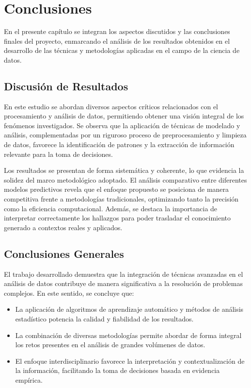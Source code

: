 \chapter{Conclusiones}

En el presente capítulo se integran los aspectos discutidos y las conclusiones finales del proyecto, enmarcando el análisis de los resultados obtenidos en el desarrollo de las técnicas y metodologías aplicadas en el campo de la ciencia de datos.

\section{Discusión de Resultados}

En este estudio se abordan diversos aspectos críticos relacionados con el procesamiento y análisis de datos, permitiendo obtener una visión integral de los fenómenos investigados. Se observa que la aplicación de técnicas de modelado y análisis, complementadas por un riguroso proceso de preprocesamiento y limpieza de datos, favorece la identificación de patrones y la extracción de información relevante para la toma de decisiones.

Los resultados se presentan de forma sistemática y coherente, lo que evidencia la solidez del marco metodológico adoptado. El análisis comparativo entre diferentes modelos predictivos revela que el enfoque propuesto se posiciona de manera competitiva frente a metodologías tradicionales, optimizando tanto la precisión como la eficiencia computacional. Además, se destaca la importancia de interpretar correctamente los hallazgos para poder trasladar el conocimiento generado a contextos reales y aplicados.

\section{Conclusiones Generales}

El trabajo desarrollado demuestra que la integración de técnicas avanzadas en el análisis de datos contribuye de manera significativa a la resolución de problemas complejos. En este sentido, se concluye que:

\begin{itemize}
    \item La aplicación de algoritmos de aprendizaje automático y métodos de análisis estadístico potencia la calidad y fiabilidad de los resultados.
    \item La combinación de diversas metodologías permite abordar de forma integral los retos presentes en el análisis de grandes volúmenes de datos.
    \item El enfoque interdisciplinario favorece la interpretación y contextualización de la información, facilitando la toma de decisiones basada en evidencia empírica.
\end{itemize}

